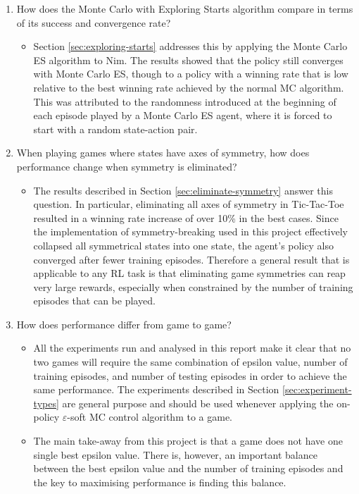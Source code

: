\documentclass[11pt,a4paper,twoside,openright]{report}
\begin{document}
\begin{enumerate}
    \item How does the Monte Carlo with Exploring Starts algorithm \cite{rl-book} compare in terms of its success and convergence rate?
	\begin{itemize}
	    \item 
Section \ref{sec:exploring-starts} addresses this by applying the Monte Carlo ES algorithm to Nim. The results showed that the policy still converges with Monte Carlo ES, though to a policy with a winning rate that is low relative to the best winning rate achieved by the normal MC algorithm. This was attributed to the randomness introduced at the beginning of each episode played by a Monte Carlo ES agent, where it is forced to start with a random state-action pair.
	\end{itemize}
    
	\item When playing games where states have axes of symmetry, how does performance change when symmetry is eliminated?
	\begin{itemize}
	    \item 
The results described in Section \ref{sec:eliminate-symmetry} answer this question. In particular, eliminating all axes of symmetry in Tic-Tac-Toe resulted in a winning rate increase of over 10\% in the best cases. Since the implementation of symmetry-breaking used in this project effectively collapsed all symmetrical states into one state, the agent's policy also converged after fewer training episodes. Therefore a general result that is applicable to any RL task is that eliminating game symmetries can reap very large rewards, especially when constrained by the number of training episodes that can be played.
	\end{itemize}
	
	\item How does performance differ from game to game?
	\begin{itemize}
	    \item 
All the experiments run and analysed in this report make it clear that no two games will require the same combination of epsilon value, number of training episodes, and number of testing episodes in order to achieve the same performance. The experiments described in Section \ref{sec:experiment-types} are general purpose and should be used whenever applying the on-policy $\varepsilon$-soft MC control algorithm to a game.
        \item 
The main take-away from this project is that a game does not have one single best epsilon value. There is, however, an important balance between the best epsilon value and the number of training episodes and the key to maximising performance is finding this balance.
	\end{itemize}
	
\end{enumerate}
\end{document}
